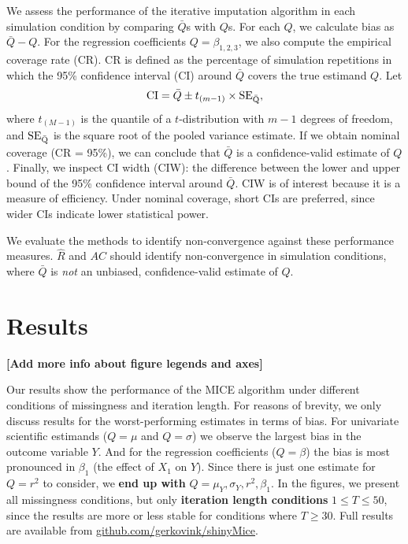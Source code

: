 \documentclass[Royal,times,sageh]{sagej}
\begin{document}
We assess the performance of the iterative imputation algorithm in each simulation condition by comparing \(\bar{Q}\)s with \(Q\)s. For each \(Q\), we calculate bias as \(\bar{Q} - Q\). For the regression coefficients \(Q=\beta_{1,2,3}\), we also compute the empirical coverage rate (CR). CR is defined as the percentage of simulation repetitions in which the 95\% confidence interval (CI) around \(\bar{Q}\) covers the true estimand \(Q\). Let
\[\text{CI} = \bar{Q} \pm t_{(m-1)} \times \rm SE_{\bar{Q}},\]
where \(t_{(M-1)}\) is the quantile of a \(t\)-distribution with \(m-1\) degrees of freedom, and \(\rm SE_{\bar{Q}}\) is the square root of the pooled variance estimate. If we obtain nominal coverage (CR = 95\%), we can conclude that \(\bar{Q}\) is a confidence-valid estimate of \(Q\). Finally, we inspect CI width (CIW): the difference between the lower and upper bound of the 95\% confidence interval around \(\bar{Q}\). CIW is of interest because it is a measure of efficiency. Under nominal coverage, short CIs are preferred, since wider CIs indicate lower statistical power.

We evaluate the methods to identify non-convergence against these performance measures. \(\widehat{R}\) and \(AC\) should identify non-convergence in simulation conditions, where \(\bar{Q}\) is \emph{not} an unbiased, confidence-valid estimate of \(Q\).

\hypertarget{results}{%
\section{Results}\label{results}}

\textbf{{[}Add more info about figure legends and axes{]}}

Our results show the performance of the MICE algorithm under different conditions of missingness and iteration length. For reasons of brevity, we only discuss results for the worst-performing estimates in terms of bias. For univariate scientific estimands (\(Q=\mu\) and \(Q=\sigma\)) we observe the largest bias in the outcome variable \(Y\). And for the regression coefficients (\(Q=\beta\)) the bias is most pronounced in \(\beta_1\) (the effect of \(X_1\) on \(Y\)). Since there is just one estimate for \(Q=r^2\) to consider, we \textbf{end up with} \(Q=\mu_Y, \sigma_Y,r^2, \beta_1\). In the figures, we present all missingness conditions, but only \textbf{iteration length conditions} \(1 \leq T\leq50\), since the results are more or less stable for conditions where \(T \geq 30\). Full results are available from \href{https://github.com/gerkovink/shinyMice/tree/master/3.Thesis/1.SimulationStudy}{github.com/gerkovink/shinyMice}.
\end{document}
